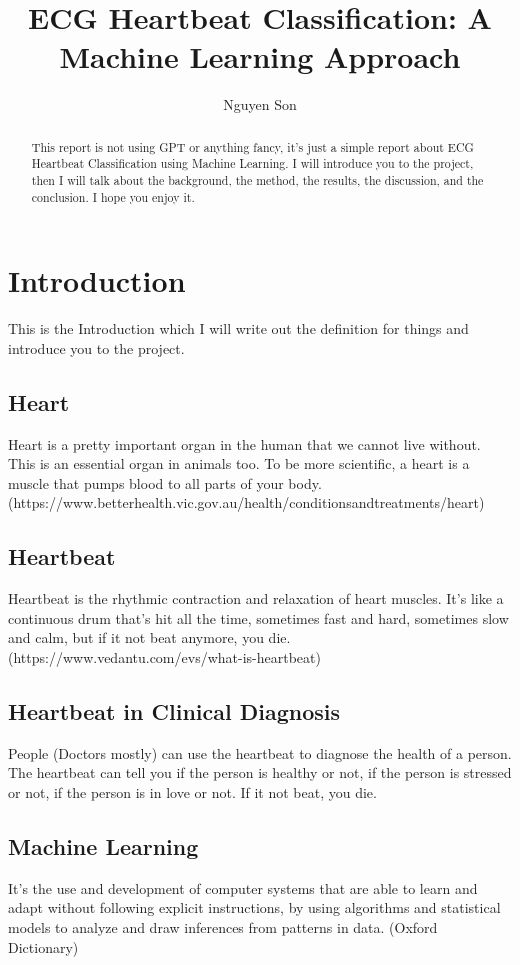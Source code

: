 \documentclass[conference]{IEEEtran}
\title{ECG Heartbeat Classification: A Machine Learning Approach}
\author{Nguyen Son}
\begin{document}
\maketitle

\begin{abstract}
    This report is not using GPT or anything fancy, it's just a simple report about ECG Heartbeat Classification using Machine Learning. I will introduce you to the project, then I will talk about the background, the method, the results, the discussion, and the conclusion. I hope you enjoy it.
\end{abstract}

\section{Introduction}
This is the Introduction which I will write out the definition for things and introduce you to the project.

\subsection{Heart}
Heart is a pretty important organ in the human that we cannot live without. This is an essential organ in animals too. To be more scientific, a heart is a muscle that pumps blood to all parts of your body. (https://www.betterhealth.vic.gov.au/health/conditionsandtreatments/heart)

\subsection{Heartbeat}
Heartbeat is the rhythmic contraction and relaxation of heart muscles. It's like a continuous drum that's hit all the time, sometimes fast and hard, sometimes slow and calm, but if it not beat anymore, you die. (https://www.vedantu.com/evs/what-is-heartbeat)

\subsection{Heartbeat in Clinical Diagnosis}
People (Doctors mostly) can use the heartbeat to diagnose the health of a person. The heartbeat can tell you if the person is healthy or not, if the person is stressed or not, if the person is in love or not. If it not beat, you die.

\subsection{Machine Learning}
It's the use and development of computer systems that are able to learn and adapt without following explicit instructions, by using algorithms and statistical models to analyze and draw inferences from patterns in data. (Oxford Dictionary)
\end{document}
